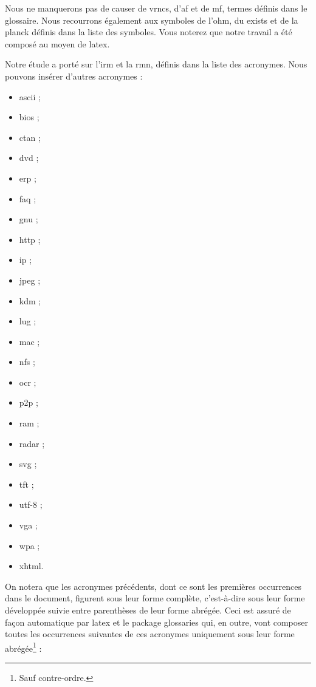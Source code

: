 \documentclass[12pt,version=final,space=onehalf,localtocs,localbibs]{yathesis}
\begin{document}
Nous ne manquerons pas de causer de \glspl{vrnc}, d'\gls{af} et de \gls{mf},
termes définis dans le glossaire. Nous recourrons également aux
symboles de l'\gls{ohm}, du \gls{exists} et de la \gls{planck} définis dans la
liste des symboles. Vous noterez que notre travail a été composé au moyen de
\gls{latex}.

Notre étude a porté sur l'\gls{irm} et la \gls{rmn}, définis dans la
liste des acronymes. Nous pouvons insérer d'autres
acronymes :
\begin{itemize}
\item \gls{ascii} ;
\item \gls{bios} ;
\item \gls{ctan} ;
\item \gls{dvd} ;
\item \gls{erp} ;
\item \gls{faq} ;
\item \gls{gnu} ;
\item \gls{http} ;
\item \gls{ip} ;
\item \gls{jpeg} ;
\item \gls{kdm} ;
\item \gls{lug} ;
\item \gls{mac} ;
\item \gls{nfs} ;
\item \gls{ocr} ;
\item \gls{p2p} ;
\item \gls{ram} ;
\item \gls{radar} ;
\item \gls{svg} ;
\item \gls{tft} ;
\item \gls{utf-8} ;
\item \gls{vga} ;
\item \gls{wpa} ;
\item \gls{xhtml}.
\end{itemize}
On notera que les acronymes précédents, dont ce sont les premières
occurrences dans le document, figurent sous leur forme complète,
c'est-à-dire sous leur forme développée suivie entre parenthèses de
leur forme abrégée. Ceci est assuré de façon automatique par
\gls{latex} et le package \textsf{glossaries} qui, en outre, vont
composer toutes les occurrences suivantes de ces acronymes
uniquement sous leur forme abrégée\footnote{Sauf contre-ordre.} :
\end{document}
